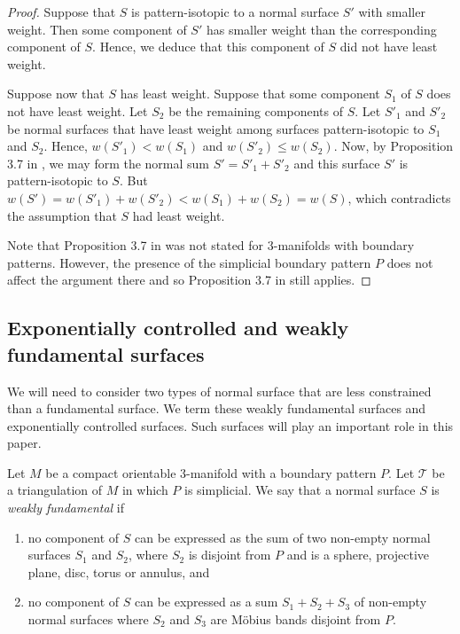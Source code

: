 \documentclass[oneside]{amsart}
\numberwithin{equation}{section}
\theoremstyle{plain}
\theoremstyle{definition}
\begin{document}
\begin{proof}
Suppose that $S$ is pattern-isotopic to a normal surface $S'$ with smaller weight.
Then some component of $S'$ has smaller weight than the corresponding component of $S$.
Hence, we deduce that this component of $S$ did not have least weight.

Suppose now that $S$ has least weight. Suppose that some component $S_1$ of $S$ does not
have least weight. Let $S_2$ be the remaining components of $S$. Let $S'_1$ and $S'_2$
be normal surfaces that have least weight among surfaces pattern-isotopic to
$S_1$ and $S_2$. Hence, $w(S'_1) < w(S_1)$
and $w(S'_2) \leq w(S_2)$. Now, by Proposition 3.7 in \cite{Jaco-Rubinstein:PL-equivariant-surgery},
we may form the normal sum
$S' = S'_1 + S'_2$ and this surface $S'$ is pattern-isotopic to $S$. 
But $w(S') = w(S'_1) + w(S'_2) < w(S_1) + w(S_2) = w(S)$,
which contradicts the assumption that $S$ had least weight.

Note that Proposition 3.7 in \cite{Jaco-Rubinstein:PL-equivariant-surgery} was not stated for 3-manifolds with boundary patterns. However,
the presence of the simplicial boundary pattern $P$ does not affect the argument there and so
Proposition 3.7 in \cite{Jaco-Rubinstein:PL-equivariant-surgery} still applies.
\end{proof}

\subsection{Exponentially controlled and weakly fundamental surfaces}
We will need to consider two types of normal surface that are less constrained than a fundamental surface.
We term these weakly fundamental surfaces and exponentially controlled surfaces. Such surfaces will play an important role in this paper.

Let $M$ be a compact orientable 3-manifold with a boundary pattern $P$. Let $\mathcal{T}$ be a triangulation of $M$
in which $P$ is simplicial. We say that a normal surface $S$ is \emph{weakly fundamental} if 
\begin{enumerate}
\item no component of $S$ can be expressed as the
sum of two non-empty normal surfaces $S_1$ and $S_2$, where $S_2$ is disjoint from $P$ and is a sphere, projective plane, disc, torus 
or annulus, and
\item no component of $S$ can be expressed as a sum $S_1 + S_2 + S_3$ of non-empty normal surfaces where $S_2$ and $S_3$ are M\"obius bands disjoint
from $P$.
\end{enumerate}
\end{document}

